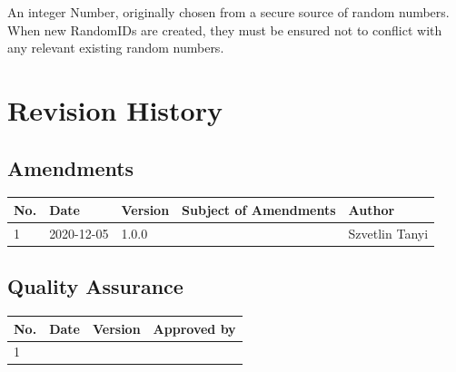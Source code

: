 \documentclass[a4paper]{arrowhead}
\begin{document}
An integer Number, originally chosen from a secure source of random numbers. When new RandomIDs are created, they must be ensured not to conflict with any relevant existing random numbers.

\newpage




\newpage

\section{Revision History}
\subsection{Amendments}

\noindent\begin{tabularx}{\textwidth}{| p{1cm} | p{3cm} | p{2cm} | X | p{4cm} |} \hline
\rowcolor{gray!33} No. & Date & Version & Subject of Amendments & Author \\ \hline

1 & 2020-12-05 & 1.0.0 & & Szvetlin Tanyi \\ \hline

\end{tabularx}

\subsection{Quality Assurance}

\noindent\begin{tabularx}{\textwidth}{| p{1cm} | p{3cm} | p{2cm} | X |} \hline
\rowcolor{gray!33} No. & Date & Version & Approved by \\ \hline

1 & & & \\ \hline

\end{tabularx}
\end{document}
